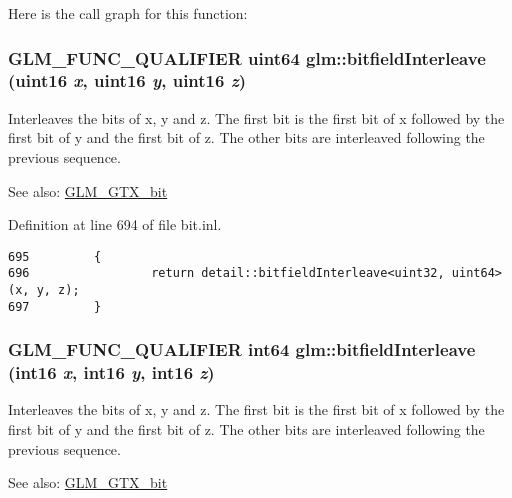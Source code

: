 Here is the call graph for this function:\hypertarget{group__gtx__bit_g3c170e2ec54f2faab5e1c5bb693d718d}{
\subsubsection[bitfieldInterleave]{\setlength{\rightskip}{0pt plus 5cm}GLM\_\-FUNC\_\-QUALIFIER uint64 glm::bitfieldInterleave (uint16 {\em x}, \/  uint16 {\em y}, \/  uint16 {\em z})}}
\label{group__gtx__bit_g3c170e2ec54f2faab5e1c5bb693d718d}


Interleaves the bits of x, y and z. The first bit is the first bit of x followed by the first bit of y and the first bit of z. The other bits are interleaved following the previous sequence.

\begin{Desc}
\item[See also:]\hyperlink{group__gtx__bit}{GLM\_\-GTX\_\-bit} \end{Desc}


Definition at line 694 of file bit.inl.

\begin{Code}\begin{verbatim}695         {
696                 return detail::bitfieldInterleave<uint32, uint64>(x, y, z);
697         }
\end{verbatim}
\end{Code}


\hypertarget{group__gtx__bit_gf898f842ac089fcc8d6201c32702584a}{
\subsubsection[bitfieldInterleave]{\setlength{\rightskip}{0pt plus 5cm}GLM\_\-FUNC\_\-QUALIFIER int64 glm::bitfieldInterleave (int16 {\em x}, \/  int16 {\em y}, \/  int16 {\em z})}}
\label{group__gtx__bit_gf898f842ac089fcc8d6201c32702584a}


Interleaves the bits of x, y and z. The first bit is the first bit of x followed by the first bit of y and the first bit of z. The other bits are interleaved following the previous sequence.

\begin{Desc}
\item[See also:]\hyperlink{group__gtx__bit}{GLM\_\-GTX\_\-bit} \end{Desc}



